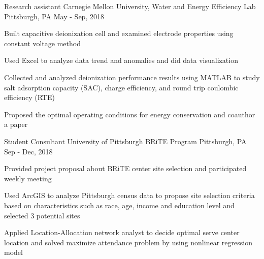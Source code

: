 

\begin{cventries}

  \cventry
    {Research assistant} %
    {Carnegie Mellon University, Water and Energy Efficiency Lab} %
    {Pittsburgh, PA} %
    {May - Sep, 2018} %
    {
      \begin{cvitems} %
        \item {Built capacitive deionization cell and examined electrode properties using constant voltage method}
         \item {Used Excel to analyze data trend and anomalies and did data visualization}
        \item {Collected and analyzed deionization performance results using MATLAB to study salt adsorption capacity (SAC), charge efficiency, and round trip coulombic efficiency (RTE)}
        \item {Proposed the optimal operating conditions for energy conservation and coauthor a paper}
      \end{cvitems}
    }

  \cventry
    {Student Consultant} %
    {University of Pittsburgh BRiTE Program } %
    {Pittsburgh, PA} %
    {Sep - Dec, 2018} %
    {
      \begin{cvitems} %
        \item {Provided project proposal about BRiTE center site selection and participated weekly meeting}
        \item {Used ArcGIS to analyze Pittsburgh census data to propose site selection criteria based on characteristics such as race, age, income and education level and selected 3 potential sites}
        \item {Applied Location-Allocation network analyst to decide optimal serve center location and solved maximize attendance problem by using nonlinear regression model}
      \end{cvitems}
    }
    

\end{cventries}
